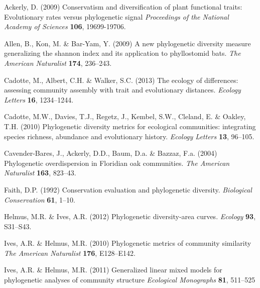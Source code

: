 \documentclass{bioinfo}
\begin{document}
\begin{thebibliography}{30}
\providecommand{\natexlab}[1]{#1}
\providecommand{\url}[1]{\texttt{#1}}
\providecommand{\urlprefix}{URL }

Ackerly, D. (2009) Conservatism and diversification of plant functional traits: Evolutionary rates versus phylogenetic signal \emph{Proceedings of the National Academy of
  Sciences} \textbf{106}, 19699-19706.

Allen, B., Kon, M. \& Bar-Yam, Y. (2009) A new phylogenetic diversity measure
  generalizing the shannon index and its application to phyllostomid bats.
  \emph{The American Naturalist} \textbf{174}, 236--243.

Cadotte, M., Albert, C.H. \& Walker, S.C. (2013) The ecology of differences:
  assessing community assembly with trait and evolutionary distances.
  \emph{Ecology Letters} \textbf{16}, 1234--1244.

Cadotte, M.W., Davies, T.J., Regetz, J., Kembel, S.W., Cleland, E. \& Oakley,
  T.H. (2010) Phylogenetic diversity metrics for ecological communities:
  integrating species richness, abundance and evolutionary history.
  \emph{Ecology Letters} \textbf{13}, 96--105.

Cavender-Bares, J., Ackerly, D.D., Baum, D.a. \& Bazzaz, F.a. (2004)
  {Phylogenetic overdispersion in Floridian oak communities}. \emph{The
  American Naturalist} \textbf{163}, 823--43.

Faith, D.P. (1992) Conservation evaluation and phylogenetic diversity.
  \emph{Biological Conservation} \textbf{61}, 1--10.

Helmus, M.R. \& Ives, A.R. (2012) Phylogenetic diversity-area curves.
  \emph{Ecology} \textbf{93}, S31--S43.

Ives, A.R. \& Helmus, M.R. (2010)
  Phylogenetic metrics of community similarity
  \emph{The American Naturalist} \textbf{176}, E128--E142.

Ives, A.R. \& Helmus, M.R. (2011) Generalized linear mixed models for phylogenetic analyses of community structure \emph{Ecological Monographs} \textbf{81}, 511--525


\end{thebibliography}
\end{document}
